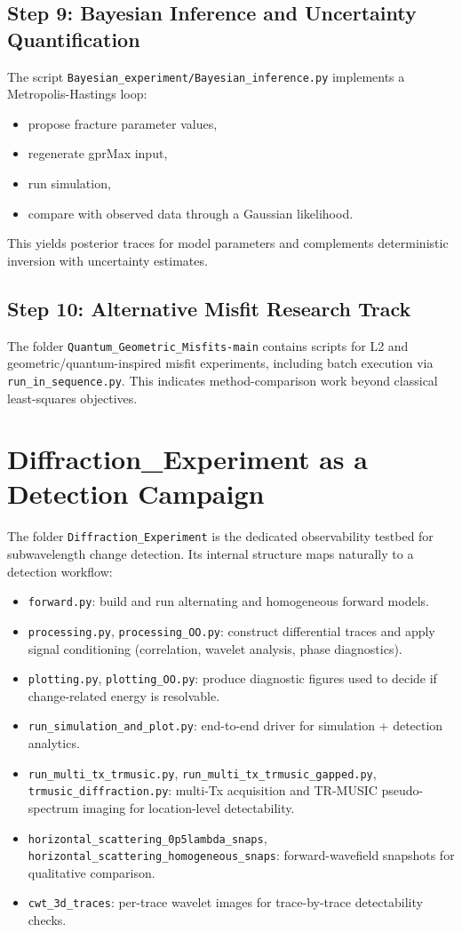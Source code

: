 \documentclass[11pt,a4paper]{article}
\newcommand{\repo}[1]{\texttt{#1}}
\begin{document}
\subsection*{Step 9: Bayesian Inference and Uncertainty Quantification}
The script \repo{Bayesian\_experiment/Bayesian\_inference.py} implements a Metropolis-Hastings loop:
\begin{itemize}
    \item propose fracture parameter values,
    \item regenerate gprMax input,
    \item run simulation,
    \item compare with observed data through a Gaussian likelihood.
\end{itemize}
This yields posterior traces for model parameters and complements deterministic inversion with uncertainty estimates.

\subsection*{Step 10: Alternative Misfit Research Track}
The folder \repo{Quantum\_Geometric\_Misfits-main} contains scripts for L2 and geometric/quantum-inspired misfit experiments, including batch execution via \repo{run\_in\_sequence.py}.
This indicates method-comparison work beyond classical least-squares objectives.

\section{Diffraction\_Experiment as a Detection Campaign}

The folder \repo{Diffraction\_Experiment} is the dedicated observability testbed for subwavelength change detection.
Its internal structure maps naturally to a detection workflow:
\begin{itemize}
    \item \repo{forward.py}: build and run alternating and homogeneous forward models.
    \item \repo{processing.py}, \repo{processing\_OO.py}: construct differential traces and apply signal conditioning (correlation, wavelet analysis, phase diagnostics).
    \item \repo{plotting.py}, \repo{plotting\_OO.py}: produce diagnostic figures used to decide if change-related energy is resolvable.
    \item \repo{run\_simulation\_and\_plot.py}: end-to-end driver for simulation + detection analytics.
    \item \repo{run\_multi\_tx\_trmusic.py}, \repo{run\_multi\_tx\_trmusic\_gapped.py}, \repo{trmusic\_diffraction.py}: multi-Tx acquisition and TR-MUSIC pseudo-spectrum imaging for location-level detectability.
    \item \repo{horizontal\_scattering\_0p5lambda\_snaps}, \repo{horizontal\_scattering\_homogeneous\_snaps}: forward-wavefield snapshots for qualitative comparison.
    \item \repo{cwt\_3d\_traces}: per-trace wavelet images for trace-by-trace detectability checks.
\end{itemize}
\end{document}
